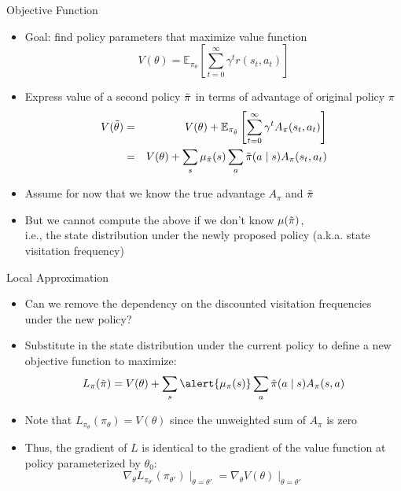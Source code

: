 \documentclass[aspectratio=169]{../latex_main/tntbeamer}  %
\begin{document}
\begin{frame}[c]{Objective Function}
	\vspace{-1em}
    \begin{itemize}
        \item Goal: find policy parameters that maximize value function
        $$ V(\theta) = \mathbb{E}_{\pi_\theta} \left[ \sum_{t=0}^{\infty} \gamma^t r(s_t, a_t)\right]$$
        \item Express value of a second policy $\Tilde{\pi}$ in terms of advantage of original policy $\pi$
        \begin{eqnarray}
        V(\Tilde{\theta}) &=& V(\theta) + \mathbb{E}_{\pi_{\Tilde{\theta}}} \left[ \sum_{t=0}^{\infty} \gamma^t A_\pi(s_t, a_t) \right] \nonumber\\
        &=& V(\theta) + \sum_{s} \mu_{\Tilde{\pi}}(s) \sum_{a} \Tilde{\pi}(a \mid s) A_\pi(s_t, a_t) \nonumber
        \end{eqnarray}
        \item Assume for now that we know the true advantage $A_\pi$ and $\Tilde{\pi}$
        \item But we cannot compute the above if we don't know $\mu(\Tilde{\pi})$,\\ i.e., the state distribution under the newly proposed policy (a.k.a. state visitation frequency)
    \end{itemize}

\end{frame}
\begin{frame}[c]{Local Approximation}
	
    \begin{itemize}
        \item Can we remove the dependency on the discounted visitation frequencies under the new policy?
        \item Substitute in the state distribution under the \alert{current} policy to define a new objective function to \alert{maximize}:
        $$ L_\pi(\Tilde{\pi}) = V(\theta) + \sum_{s} \alert{\mu_\pi (s)} \sum_{a} \Tilde{\pi}(a \mid s) A_\pi(s,a)$$
        \item Note that $L_{\pi_{\theta}}(\pi_{\theta}) = V(\theta)$ since the unweighted sum of $A_\pi$ is zero
        \item Thus, the gradient of $L$ is identical to the gradient of the value function at policy parameterized by $\theta_0$: 
        $$\nabla_{\theta} L_{\pi_{\theta'}}(\pi_{\theta'})\mid_{\theta = \theta'} = \nabla_\theta V(\theta)\mid_{\theta = \theta'}$$
    \end{itemize}

\end{frame}
\end{document}
